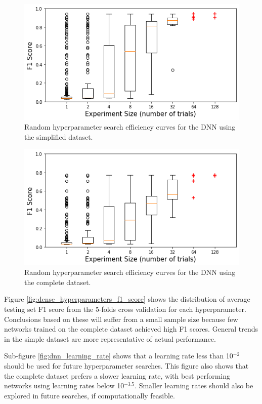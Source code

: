 \begin{figure}[H]
	\centering
	\includegraphics[width=0.8\linewidth]{images/random_hp_search_dnn_easy}
	\caption{Random hyperparameter search efficiency curves for the DNN using the simplified dataset.}
	\label{fig:random_hp_search_dnn_easy}
\end{figure}

\begin{figure}[H]
	\centering
	\includegraphics[width=0.8\linewidth]{images/random_hp_search_dnn_full}
	\caption{Random hyperparameter search efficiency curves for the DNN using the complete dataset.}
	\label{fig:random_hp_search_dnn_full}
\end{figure}


Figure \ref{fig:dense_hyperparameters_f1_score} shows the distribution of average testing set F1 score from the 5-folds cross validation for each hyperparameter. Conclusions based on these will suffer from a small sample size because few networks trained on the complete dataset achieved high F1 scores. General trends in the simple dataset are more representative of actual performance.

Sub-figure \ref{fig:dnn_learning_rate} shows that a learning rate less than 10$^{-2}$ should be used for future hyperparameter searches. This figure also shows that the complete dataset prefers a slower learning rate, with best performing networks using learning rates below 10$^{-3.5}$. Smaller learning rates should also be explored in future searches, if computationally feasible.

